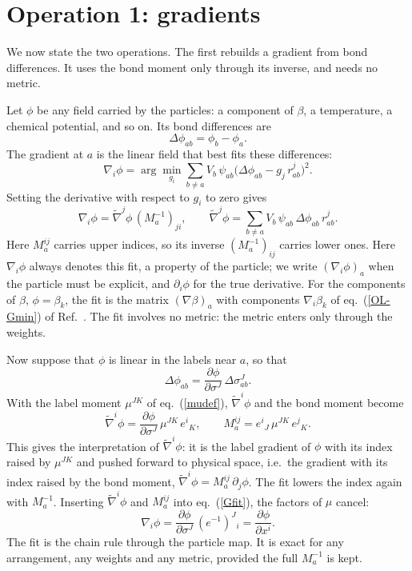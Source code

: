 \documentclass[11pt,aps,preprint,nofootinbib,superscriptaddress,tightenlines]{revtex4-2}
\def\st{\begin{equation}}
\def\stp{\end{equation}}
\def\Eq#1{eq.~(\ref{#1})}
\newcommand{\EqOL}[1]{eq.~(\ref{OL-#1}) of Ref.~\cite{OneLevel}}
\begin{document}
\section{Operation 1: gradients}
\label{sec:op1}

We now state the two operations.  The first rebuilds a gradient from bond
differences.  It uses the bond moment only through its inverse, and needs no
metric.

Let $\phi$ be any field carried by the particles: a component of $\beta$, a
temperature, a chemical potential, and so on.  Its bond differences are
\st
\Delta\phi_{ab}=\phi_b-\phi_a .
\stp
The gradient at $a$ is the linear field that best fits these differences:
\st
\nabla_i\phi=\arg\min_{g_i}\sum_{b\neq a}V_b\,\psi_{ab}\big(\Delta\phi_{ab}-g_j\,r^j_{ab}\big)^2 .
\stp
Setting the derivative with respect to $g_i$ to zero gives
\st
\nabla_i\phi=\tilde\nabla^j\phi\,(M_a^{-1})_{ji},\qquad
\tilde\nabla^j\phi=\sum_{b\neq a}V_b\,\psi_{ab}\,\Delta\phi_{ab}\,r^j_{ab} .
\label{Gfit}
\stp
Here $M_a^{ij}$ carries upper indices, so its inverse $(M_a^{-1})_{ij}$ carries lower ones.
Here $\nabla_i\phi$ always denotes this fit, a property of the particle; we write
$(\nabla_i\phi)_a$ when the particle must be explicit, and $\partial_i\phi$ for
the true derivative.  For the components of $\beta$, $\phi=\beta_k$, the fit
is the matrix $(\nabla\beta)_a$ with components $\nabla_i\beta_k$ of \EqOL{Gmin}.  The fit involves no metric: the
metric enters only through the weights.

Now suppose that $\phi$ is linear in the labels near $a$, so that
\st
\Delta\phi_{ab}=\frac{\partial\phi}{\partial\sigma^J}\,\Delta\sigma^J_{ab} .
\stp
With the label moment $\mu^{JK}$ of \Eq{mudef}, $\tilde\nabla^i\phi$ and the bond moment
become
\st
\tilde\nabla^i\phi=\frac{\partial\phi}{\partial\sigma^J}\,\mu^{JK}\,e^i{}_K,\qquad
M_a^{ij}=e^i{}_J\,\mu^{JK}\,e^j{}_K .
\stp
This gives the interpretation of $\tilde\nabla^i\phi$: it is the label gradient of $\phi$
with its index raised by $\mu^{JK}$ and pushed forward to physical space, i.e.\ the
gradient with its index raised by the bond moment, $\tilde\nabla^i\phi=M_a^{ij}\,\partial_j\phi$.
The fit lowers the index again with $M_a^{-1}$.  Inserting $\tilde\nabla^i\phi$ and
$M_a^{ij}$ into \Eq{Gfit}, the factors of $\mu$ cancel:
\st
\nabla_i\phi=\frac{\partial\phi}{\partial\sigma^J}\,(e^{-1})^J{}_i=\frac{\partial\phi}{\partial x^i} .
\stp
The fit is the chain rule through the particle map.  It is exact for any
arrangement, any weights and any metric, provided the full $M_a^{-1}$ is kept.
\end{document}
